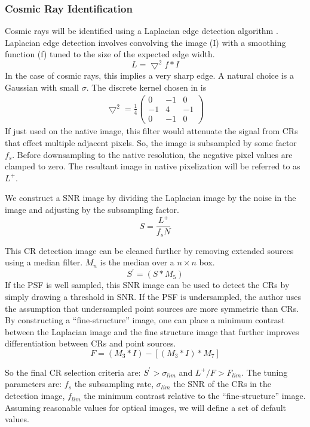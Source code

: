 \subsubsection{Cosmic Ray Identification}
\label{sec:acCosmicRayDetection}
Cosmic rays will be identified using a Laplacian edge detection algorithm \citep{dokkum01}.  Laplacian edge detection involves convolving the image (I) with a smoothing function (f) tuned to the size of the expected edge width.
\[
L = \bigtriangledown^2f\ast I
\]
In the case of cosmic rays, this implies a very sharp edge.  A natural choice is a Gaussian with small $\sigma$.  The discrete kernel chosen in \citep{dokkum01} is
\begin{align}
\bigtriangledown^2 = \frac{1}{4}\left( \begin{array}{ccc}
0 & -1 & 0 \\
-1 & 4 & -1 \\
0 & -1 & 0 \end{array} \right)
\end{align}
If just used on the native image, this filter would attenuate the signal from CRs that effect multiple
adjacent pixels.  So, the image is subsampled by some factor $f_s$.  Before downsampling to the native resolution, the negative pixel values are clamped to zero.  The resultant image in native pixelization will be referred to as $L^+$.

We construct a SNR image by dividing the Laplacian image by the noise in the image and adjusting by the subsampling factor.
\[
S = \frac{L^+}{f_s N}
\]

This CR detection image can be cleaned further by removing extended sources using a median filter. $M_n$ is the median over a $n \times n$ box.
\[
S^\prime = (S \ast M_5)
\]
If the PSF is well sampled, this SNR image can be used to detect the CRs by simply drawing a threshold in SNR.
If the PSF is undersampled, the author uses the assumption that undersampled point sources are more symmetric
than CRs.  By constructing a ``fine-structure'' image, one can place a minimum contrast between the Laplacian image and the fine structure image that further improves differentiation between CRs and point sources.
\[
F = (M_3 \ast I) - [(M_3 \ast I) \ast M_7]
\]

So the final CR selection criteria are: $S^\prime > \sigma_{lim}$ and $L^+/F > F_{lim}$.  The tuning
parameters are: $f_s$ the subsampling rate, $\sigma_{lim}$ the SNR of the CRs in the detection image,
$f_{lim}$ the minimum contrast relative to the ``fine-structure'' image. Assuming reasonable values for optical
images, we will define a set of default values.

